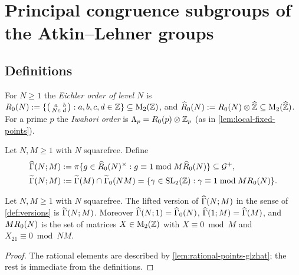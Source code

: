 \section{Principal congruence subgroups of the Atkin--Lehner groups}
\label{sec:principal}

\subsection{Definitions}

\begin{definition}\label{def:eichler-order}
For $N \geq 1$ the \emph{Eichler order of level $N$} is
$R_{0}(N) := \{\left(\begin{smallmatrix} a & b \\ Nc & d \end{smallmatrix}\right) : a,b,c,d \in \mathbb{Z}\} \subseteq
\mathrm{M}_{2}(\mathbb{Z})$, and $\widehat{R}_{0}(N) := R_{0}(N)
\otimes\widehat{\mathbb{Z}} \subseteq \mathrm{M}_{2}(\widehat{\mathbb{Z}})$. For a prime
$p$ the \emph{Iwahori order} is $\Lambda_{p} = R_{0}(p)\otimes
\mathbb{Z}_{p}$ (as in \cref{lem:local-fixed-points}).
\end{definition}

\begin{definition}
\label{def:principal-NM}
Let $N, M \geq 1$ with $N$ squarefree. Define
\begin{align*}
  \GammaPrincipal[ad]{N}{M} &:= \AdelicProjection\{g \in \unit{\AdelicEichlerOrder{N}} :
  g \equiv 1 \bmod M\AdelicEichlerOrder{N}\} \subseteq \AdelicGroup,\\
  \GammaPrincipal[lift]{N}{M} &:= \GammaFull[lift]{M}\cap\GammaZero[lift]{NM}
  = \{\gamma \in \SL{2}{\ZZ} : \gamma \equiv 1 \bmod M\EichlerOrder{N}\}.
\end{align*}
\end{definition}

\begin{lemma}
\label{lem:principal-lifted}
Let $N, M \geq 1$ with $N$ squarefree. The lifted version of
$\GammaPrincipal[ad]{N}{M}$ in the sense of \cref{def:versions} is
$\GammaPrincipal[lift]{N}{M}$. Moreover $\GammaPrincipal[ad]{N}{1} =
\GammaZero[ad]{N}$, $\GammaPrincipal[ad]{1}{M} = \GammaFull[ad]{M}$, and
$MR_{0}(N)$ is the set of matrices $X \in \mathrm{M}_{2}(\mathbb{Z})$ with
$X \equiv 0 \bmod M$ and $X_{21} \equiv 0 \bmod NM$.
\end{lemma}

\begin{proof}
The rational elements are described by \cref{lem:rational-points-glzhat};
the rest is immediate from the definitions.
\end{proof}

